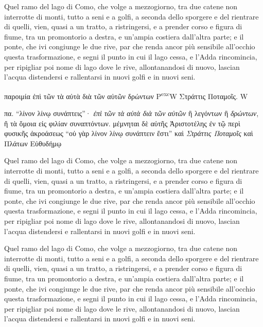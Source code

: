 \documentclass[11pt,a4paper]{book}
\begin{document}
Quel ramo del lago di Como, che volge a mezzogiorno, tra due catene non interrotte di monti, tutto a seni e a golfi, a seconda dello sporgere e del rientrare di quelli, vien, quasi a un tratto, a ristringersi, e a prender corso e figura di fiume, tra un promontorio a destra, e un’ampia costiera dall’altra parte; e il ponte, che ivi congiunge le due rive, par che renda ancor più sensibile all’occhio questa trasformazione, e segni il punto in cui il lago cessa, e l’Adda rincomincia, per ripigliar poi nome di lago dove le rive, allontanandosi di nuovo, lascian l’acqua distendersi e rallentarsi in nuovi golfi e in nuovi seni.


\begin{pairs}
	\begin{Leftside}
	\beginnumbering
	\pstart
	\textgreek{παροιμία ἐπὶ τῶν τὰ αὐτὰ διὰ τῶν αὐτῶν δρώντων} P\textsuperscript{exc}W
	\pend
	\pstart
	\noindent\textgreek{Στράττις Ποταμοῖς}. W
	\pend
	\endnumbering
	\end{Leftside}

	\begin{Rightside}
	\beginnumbering
	\pstart
	\textgreek{πα. “λίνον λίνῳ συνάπτεις”· \textit{ἐπὶ τῶν τὰ αὐτὰ διὰ τῶν αὐτῶν} ἢ λεγόντων ἢ \textit{δρώντων}, ἢ τὰ ὅμοια εἰς φιλίαν συναπτόντων. μέμνηται δὲ αὐτῆς Ἀριστοτέλης ἐν τῷ  περὶ φυσικῆς ἀκροάσεως “οὐ γὰρ λίνον λίνῳ συνάπτειν ἔστι”}
	\pend
	\pstart
	\textgreek{καὶ \textit{Στράττις Ποταμοῖς} καὶ Πλάτων Εὐθυδήμῳ}
	\pend
	\endnumbering
	\end{Rightside}
\end{pairs}
\Columns

Quel ramo del lago di Como, che volge a mezzogiorno, tra due catene non interrotte di monti, tutto a seni e a golfi, a seconda dello sporgere e del rientrare di quelli, vien, quasi a un tratto, a ristringersi, e a prender corso e figura di fiume, tra un promontorio a destra, e un’ampia costiera dall’altra parte; e il ponte, che ivi congiunge le due rive, par che renda ancor più sensibile all’occhio questa trasformazione, e segni il punto in cui il lago cessa, e l’Adda rincomincia, per ripigliar poi nome di lago dove le rive, allontanandosi di nuovo, lascian l’acqua distendersi e rallentarsi in nuovi golfi e in nuovi seni.


\beginnumbering
\pstart
Quel ramo del lago di Como, che volge a mezzogiorno, tra due catene non interrotte di monti, tutto a seni e a golfi, a seconda dello sporgere e del rientrare di quelli, vien, quasi a un tratto, a ristringersi, e a prender corso e figura di fiume, tra un promontorio a destra, e un’ampia costiera dall’altra parte; e il ponte, che ivi congiunge le due rive, par che renda ancor più sensibile all’occhio questa trasformazione, e segni il punto in cui il lago cessa, e l’Adda rincomincia, per ripigliar poi nome di lago dove le rive, allontanandosi di nuovo, lascian l’acqua distendersi e rallentarsi in nuovi golfi e in nuovi seni.
\pend
\end{document}
